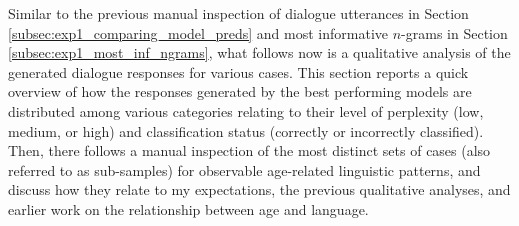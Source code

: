     
    
    
    



Similar to the previous manual inspection of dialogue utterances in Section \ref{subsec:exp1_comparing_model_preds} and most informative $n$-grams in Section \ref{subsec:exp1_most_inf_ngrams}, what follows now is a qualitative analysis of the generated dialogue responses for various cases.
This section reports a quick overview of how the responses generated by the best performing models are distributed among various categories relating to their level of perplexity (low, medium, or high) and classification status (correctly or incorrectly classified).
Then, there follows a manual inspection of the most distinct sets of cases (also referred to as sub-samples) for observable age-related linguistic patterns, and discuss how they relate to my expectations, the previous qualitative analyses, and earlier work on the relationship between age and language.


